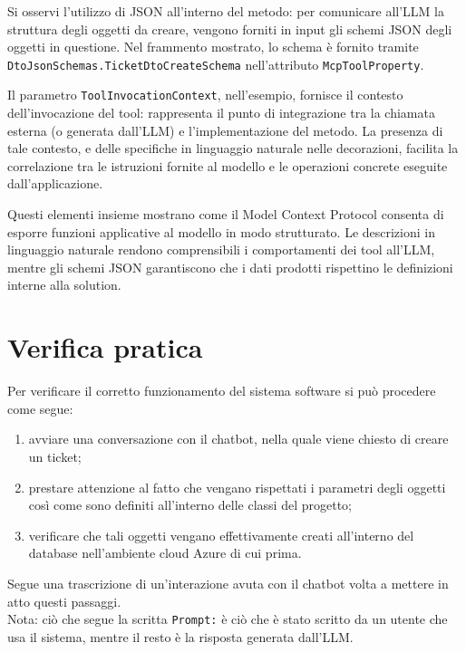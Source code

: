 Si osservi l'utilizzo di JSON all'interno del metodo: per comunicare all'LLM la struttura degli oggetti da creare, vengono forniti in input
gli schemi JSON degli oggetti in questione. Nel frammento mostrato, lo schema è fornito tramite \texttt{DtoJsonSchemas.TicketDtoCreateSchema}
nell'attributo \texttt{McpToolProperty}.

Il parametro \texttt{ToolInvocationContext}, nell'esempio, fornisce il contesto dell'invocazione del tool:
rappresenta il punto di integrazione tra la chiamata esterna (o generata dall'LLM) e l'implementazione del metodo.
La presenza di tale contesto, e delle specifiche in linguaggio naturale nelle decorazioni, facilita la correlazione tra le istruzioni fornite al modello
e le operazioni concrete eseguite dall'applicazione.

Questi elementi insieme mostrano come il Model Context Protocol consenta di esporre funzioni applicative al modello in modo strutturato.
Le descrizioni in linguaggio naturale rendono comprensibili i comportamenti dei tool all'LLM, mentre gli schemi JSON garantiscono che i dati prodotti
rispettino le definizioni interne alla solution.

\newpage
\section{Verifica pratica}
Per verificare il corretto funzionamento del sistema software si può procedere come segue:
\begin{enumerate}
    \item avviare una conversazione con il chatbot, nella quale viene chiesto di creare un ticket;
    \item prestare attenzione al fatto che vengano rispettati i parametri degli oggetti così come sono definiti all'interno delle classi del progetto;
    \item verificare che tali oggetti vengano effettivamente creati all'interno del database nell'ambiente cloud Azure di cui prima.
\end{enumerate}
Segue una trascrizione di un'interazione avuta con il chatbot volta a mettere in atto questi passaggi. \\
Nota: ciò che segue la scritta \texttt{Prompt:} è ciò che è stato scritto da un utente che usa il sistema, mentre il resto è la risposta generata dall'LLM.

